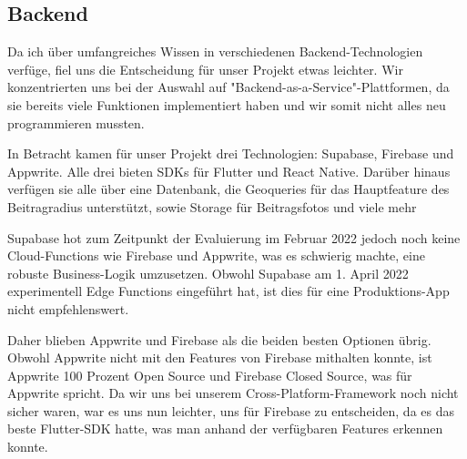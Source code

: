 
\subsection
{Backend}
Da ich über umfangreiches Wissen in verschiedenen Backend-Technologien verfüge, fiel uns die Entscheidung für unser Projekt etwas leichter. Wir konzentrierten uns bei der Auswahl auf "Backend-as-a-Service"-Plattformen, da sie bereits viele Funktionen implementiert haben und wir somit nicht alles neu programmieren mussten.

In Betracht kamen für unser Projekt drei Technologien: Supabase, Firebase und Appwrite. Alle drei bieten SDKs für Flutter und React Native. Darüber hinaus verfügen sie alle über eine Datenbank, die Geoqueries für das Hauptfeature des Beitragradius unterstützt, sowie Storage für Beitragsfotos und viele mehr

Supabase hot zum Zeitpunkt der Evaluierung im Februar 2022 jedoch noch keine Cloud-Functions wie Firebase und Appwrite, was es schwierig machte, eine robuste Business-Logik umzusetzen. Obwohl Supabase am 1. April 2022 experimentell Edge Functions eingeführt hat, ist dies für eine Produktions-App nicht empfehlenswert.

Daher blieben Appwrite und Firebase als die beiden besten Optionen übrig. Obwohl Appwrite nicht mit den Features von Firebase mithalten konnte, ist Appwrite 100 Prozent Open Source und Firebase Closed Source, was für Appwrite spricht. Da wir uns bei unserem Cross-Platform-Framework noch nicht sicher waren, war es uns nun leichter, uns für Firebase zu entscheiden, da es das beste Flutter-SDK hatte, was man anhand der verfügbaren Features erkennen konnte.




